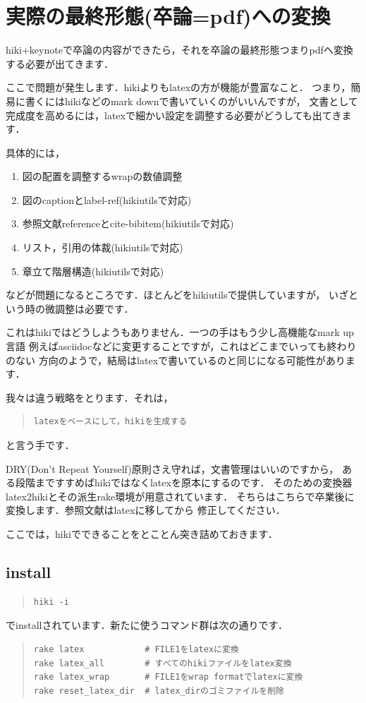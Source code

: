 
\section{実際の最終形態(卒論=pdf)への変換}
hiki+keynoteで卒論の内容ができたら，それを卒論の最終形態つまりpdfへ変換する必要が出てきます．

ここで問題が発生します．hikiよりもlatexの方が機能が豊富なこと．
つまり，簡易に書くにはhikiなどのmark downで書いていくのがいいんですが，
文書として完成度を高めるには，latexで細かい設定を調整する必要がどうしても出てきます．

具体的には，

\begin{enumerate}
\item 図の配置を調整するwrapの数値調整
\item 図のcaptionとlabel-ref(hikiutilsで対応)
\item 参照文献referenceとcite-bibitem(hikiutilsで対応)
\item リスト，引用の体裁(hikiutilsで対応)
\item 章立て階層構造(hikiutilsで対応)
\end{enumerate}
などが問題になるところです．ほとんどをhikiutilsで提供していますが，
いざという時の微調整は必要です．

これはhikiではどうしようもありません．一つの手はもう少し高機能なmark up言語
例えばasciidocなどに変更することですが，これはどこまでいっても終わりのない
方向のようで，結局はlatexで書いているのと同じになる可能性があります．

我々は違う戦略をとります．それは，
\begin{quote}\begin{verbatim}
latexをベースにして，hikiを生成する
\end{verbatim}\end{quote}
と言う手です．

DRY(Don't Repeat Yourself)原則さえ守れば，文書管理はいいのですから，
ある段階まですすめばhikiではなくlatexを原本にするのです．
そのための変換器latex2hikiとその派生rake環境が用意されています．
そちらはこちらで卒業後に変換します．参照文献はlatexに移してから
修正してください．

ここでは，hikiでできることをとことん突き詰めておきます．

\subsection{install}\begin{quote}\begin{verbatim}
hiki -i
\end{verbatim}\end{quote}
でinstallされています．新たに使うコマンド群は次の通りです．
\begin{quote}\begin{verbatim}
rake latex            # FILE1をlatexに変換
rake latex_all        # すべてのhikiファイルをlatex変換
rake latex_wrap       # FILE1をwrap formatでlatexに変換
rake reset_latex_dir  # latex_dirのゴミファイルを削除
\end{verbatim}\end{quote}
